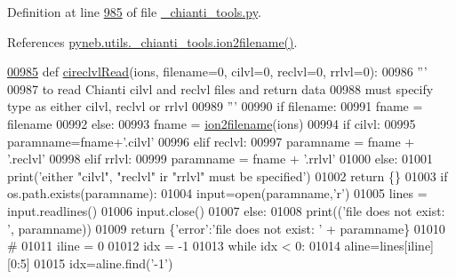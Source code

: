 Definition at line \hyperlink{__chianti__tools_8py_source_l00985}{985} of file \hyperlink{__chianti__tools_8py_source}{\+\_\+chianti\+\_\+tools.\+py}.



References \hyperlink{__chianti__tools_8py_source_l00396}{pyneb.\+utils.\+\_\+chianti\+\_\+tools.\+ion2filename()}.


\begin{DoxyCode}
\hypertarget{namespacepyneb_1_1utils_1_1__chianti__tools_l00985}{}\hyperlink{namespacepyneb_1_1utils_1_1__chianti__tools_a0811a3ad9efb623a53fd1ebfd8c5c73f}{00985} \textcolor{keyword}{def }\hyperlink{namespacepyneb_1_1utils_1_1__chianti__tools_a0811a3ad9efb623a53fd1ebfd8c5c73f}{cireclvlRead}(ions, filename=0, cilvl=0, reclvl=0, rrlvl=0):
00986     \textcolor{stringliteral}{'''}
00987 \textcolor{stringliteral}{    to read Chianti cilvl and reclvl files and return data}
00988 \textcolor{stringliteral}{    must specify type as either cilvl, reclvl or rrlvl}
00989 \textcolor{stringliteral}{    '''}
00990     \textcolor{keywordflow}{if} filename:
00991         fname = filename
00992     \textcolor{keywordflow}{else}:
00993         fname = \hyperlink{namespacepyneb_1_1utils_1_1__chianti__tools_ad4bc7b577fd4c3819ceb00b0a444351b}{ion2filename}(ions)
00994     \textcolor{keywordflow}{if} cilvl:
00995         paramname=fname+\textcolor{stringliteral}{'.cilvl'}
00996     \textcolor{keywordflow}{elif} reclvl:
00997         paramname = fname + \textcolor{stringliteral}{'.reclvl'}
00998     \textcolor{keywordflow}{elif} rrlvl:
00999         paramname = fname + \textcolor{stringliteral}{'.rrlvl'}
01000     \textcolor{keywordflow}{else}:
01001         print(\textcolor{stringliteral}{'either "cilvl", "reclvl" ir "rrlvl" must be specified'})
01002         \textcolor{keywordflow}{return} \{\}
01003     \textcolor{keywordflow}{if} os.path.exists(paramname):
01004         input=open(paramname,\textcolor{stringliteral}{'}\textcolor{stringliteral}{r')}
01005 \textcolor{stringliteral}{        lines = input.readlines()}
01006 \textcolor{stringliteral}{        input.close()}
01007 \textcolor{stringliteral}{    }\textcolor{keywordflow}{else}:
01008         print((\textcolor{stringliteral}{'file does not exist:  '}, paramname))
01009         \textcolor{keywordflow}{return} \{\textcolor{stringliteral}{'error'}:\textcolor{stringliteral}{'file does not exist: '} + paramname\}
01010     \textcolor{comment}{#}
01011     iline = 0
01012     idx = -1
01013     \textcolor{keywordflow}{while} idx < 0:
01014         aline=lines[iline][0:5]
01015         idx=aline.find(\textcolor{stringliteral}{'-1'})

\end{DoxyCode}
